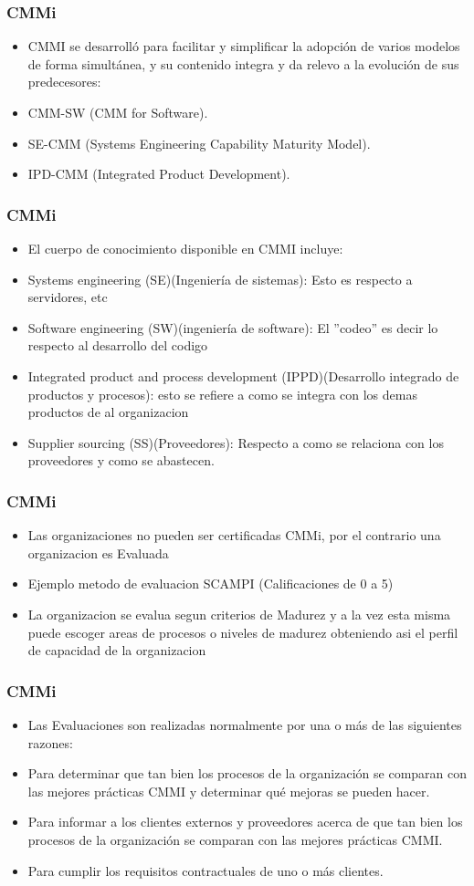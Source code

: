 \documentclass{beamer}
\begin{document}
\frame
{
  \frametitle{CMMi}
  	\begin{itemize}
  	\item<1-> CMMI se desarrolló para facilitar y simplificar la adopción de varios modelos de
forma simultánea, y su contenido integra y da relevo a la evolución de sus
predecesores:

  	\item<2-> CMM-SW (CMM for Software).
	\item<3-> SE-CMM (Systems Engineering Capability Maturity Model).
    \item<4-> IPD-CMM (Integrated Product Development).

  	\end{itemize}
}

\frame
{
  \frametitle{CMMi}
  	\begin{itemize}
  	\item<1-> El cuerpo de conocimiento disponible en CMMI incluye:

  	\item<2-> Systems engineering (SE)(Ingeniería de sistemas): Esto es respecto a servidores, etc
	\item<3-> Software engineering (SW)(ingeniería de software): El ''codeo'' es decir lo respecto al desarrollo del codigo
	\item<4-> Integrated product and process development (IPPD)(Desarrollo integrado de productos y procesos):  esto se refiere a como se integra con los demas productos de al organizacion
	\item<5-> Supplier sourcing (SS)(Proveedores): Respecto a como se relaciona con los proveedores y como se abastecen.
\end{itemize}
}


\frame
{
  \frametitle{CMMi}
  	\begin{itemize}
  	\item<1-> Las organizaciones no pueden ser certificadas CMMi, por el contrario una organizacion es Evaluada
  	\item<2-> Ejemplo metodo de evaluacion SCAMPI (Calificaciones de 0 a 5)
  	\item<3-> La organizacion se evalua segun criterios de Madurez y a la vez esta misma puede escoger areas de procesos o niveles de madurez obteniendo asi el perfil de capacidad de la organizacion
  	\end{itemize}
}

\frame
{
  \frametitle{CMMi}
  	\begin{itemize}
  	\item<1-> Las Evaluaciones son realizadas normalmente por una o más de las siguientes razones:
  	\item<2-> Para determinar que tan bien los procesos de la organización se comparan con las mejores prácticas CMMI y determinar qué mejoras se pueden hacer.
  	\item<3-> Para informar a los clientes externos y proveedores acerca de que tan bien los procesos de la organización se comparan con las mejores prácticas CMMI.
  	\item<4-> Para cumplir los requisitos contractuales de uno o más clientes.
  	\end{itemize}
}
\end{document}
